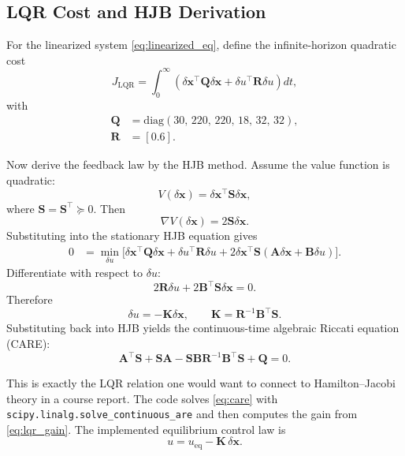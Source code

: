 \documentclass[conference]{IEEEtran}
\begin{document}
\subsection{LQR Cost and HJB Derivation}
For the linearized system \eqref{eq:linearized_eq}, define the infinite-horizon quadratic cost
\begin{equation}
J_{\mathrm{LQR}}
=
\int_0^{\infty}
\left(
\delta\bm{x}^{\top}\bm{Q}\delta\bm{x}
+
\delta u^{\top}\bm{R}\delta u
\right)dt,
\end{equation}
with
\begin{align}
\bm{Q} &= \mathrm{diag}(30,\,220,\,220,\,18,\,32,\,32), \\
\bm{R} &= [0.6].
\end{align}

Now derive the feedback law by the HJB method. Assume the value function is quadratic:
\begin{equation}
V(\delta\bm{x}) = \delta\bm{x}^{\top}\bm{S}\delta\bm{x},
\end{equation}
where $\bm{S}=\bm{S}^{\top}\succcurlyeq 0$. Then
\begin{equation}
\nabla V(\delta\bm{x}) = 2\bm{S}\delta\bm{x}.
\end{equation}
Substituting into the stationary HJB equation gives
\begin{align}
0 &=
\min_{\delta u}
\Big[
\delta\bm{x}^{\top}\bm{Q}\delta\bm{x}
+
\delta u^{\top}\bm{R}\delta u
+
2\delta\bm{x}^{\top}\bm{S}(\bm{A}\delta\bm{x}+\bm{B}\delta u)
\Big].
\end{align}
Differentiate with respect to $\delta u$:
\begin{equation}
2\bm{R}\delta u + 2\bm{B}^{\top}\bm{S}\delta\bm{x}=0.
\end{equation}
Therefore
\begin{equation}
\delta u = -\bm{K}\delta\bm{x},
\qquad
\bm{K}=\bm{R}^{-1}\bm{B}^{\top}\bm{S}.
\label{eq:lqr_gain}
\end{equation}
Substituting back into HJB yields the continuous-time algebraic Riccati equation (CARE):
\begin{equation}
\bm{A}^{\top}\bm{S}
+
\bm{S}\bm{A}
- \bm{S}\bm{B}\bm{R}^{-1}\bm{B}^{\top}\bm{S}
+
\bm{Q}
= 0.
\label{eq:care}
\end{equation}

This is exactly the LQR relation one would want to connect to Hamilton--Jacobi theory in a course report. The code solves \eqref{eq:care} with \texttt{scipy.linalg.solve\_continuous\_are} and then computes the gain from \eqref{eq:lqr_gain}. The implemented equilibrium control law is
\begin{equation}
u = u_{\mathrm{eq}} - \bm{K}\,\delta\bm{x}.
\end{equation}
\end{document}
